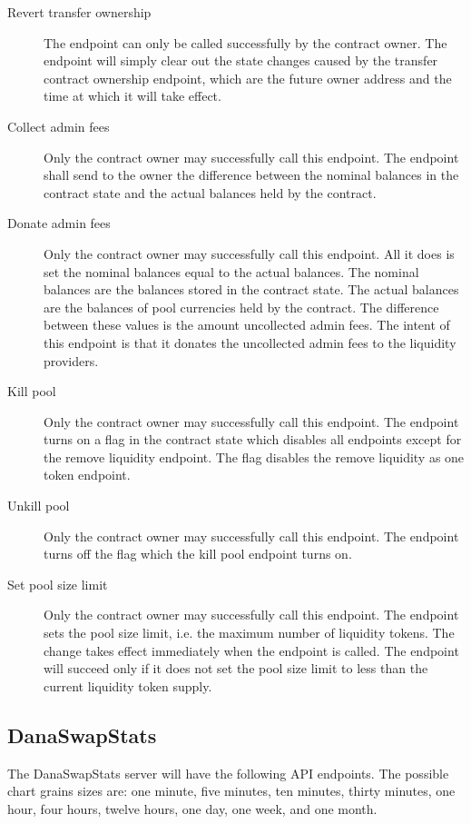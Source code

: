 \documentclass[12pt]{article}
\begin{document}
\begin{description}
	\item[Revert transfer ownership] The endpoint can only be called successfully by the contract owner. The endpoint will simply clear out the state changes caused by the transfer contract ownership endpoint, which are the future owner address and the time at which it will take effect.
	
	\item[Collect admin fees] Only the contract owner may successfully call this endpoint. The endpoint shall send to the owner the difference between the nominal balances in the contract state and the actual balances held by the contract.

	\item[Donate admin fees] Only the contract owner may successfully call this endpoint. All it does is set the nominal balances equal to the actual balances. The nominal balances are the balances stored in the contract state. The actual balances are the balances of pool currencies held by the contract. The difference between these values is the amount uncollected admin fees. The intent of this endpoint is that it donates the uncollected admin fees to the liquidity providers.

	\item[Kill pool] Only the contract owner may successfully call this endpoint. The endpoint turns on a flag in the contract state which disables all endpoints except for the remove liquidity endpoint. The flag disables the remove liquidity as one token endpoint.

	\item[Unkill pool] Only the contract owner may successfully call this endpoint. The endpoint turns off the flag which the kill pool endpoint turns on.

	\item[Set pool size limit] Only the contract owner may successfully call this endpoint. The endpoint sets the pool size limit, i.e. the maximum number of liquidity tokens. The change takes effect immediately when the endpoint is called. The endpoint will succeed only if it does not set the pool size limit to less than the current liquidity token supply.
\end{description}


\subsection{DanaSwapStats}

The DanaSwapStats server will have the following API endpoints. The possible chart grains sizes are: one minute, five minutes, ten minutes, thirty minutes, one hour, four hours, twelve hours, one day, one week, and one month.
\end{document}
